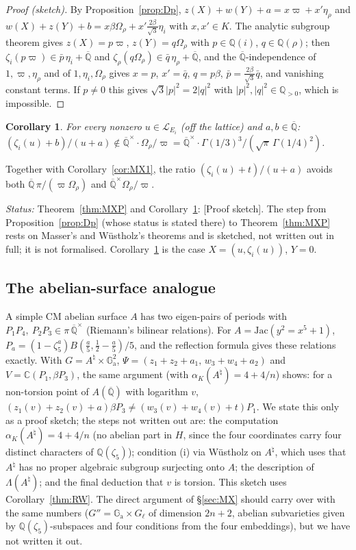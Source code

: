 \documentclass[11pt]{amsart}
\newtheorem{corollary}[theorem]{Corollary}
\theoremstyle{definition}
\newcommand{\Qb}{\overline{\mathbb{Q}}}
\newcommand{\C}{\mathbb{C}}
\newcommand{\Q}{\mathbb{Q}}
\newcommand{\Ga}{\mathbb{G}_{\mathrm a}}
\newcommand{\Lg}{\mathcal{L}}
\newcommand{\vp}{\varpi}
\newcommand{\lab}[1]{\textup{[#1]}}
\newcommand{\LabS}{\lab{Proof sketch}}
\newcommand{\Status}{\noindent\emph{Status:} }
\begin{document}
\begin{proof}[Proof (sketch)]
By Proposition~\ref{prop:Dp}, $z(X)+w(Y)+a=x\vp+x'\eta_\rho$ and $w(X)+z(Y)+b=x\beta\Omega_\rho+x'\tfrac{2\beta}{\sqrt3}\eta_i$
with $x,x'\in K$. The analytic subgroup theorem gives $z(X)=p\vp$, $z(Y)=q\Omega_\rho$ with $p\in\Q(i)$, $q\in\Q(\rho)$;
then $\zeta_i(p\vp)\in\bar p\,\eta_i+\Qb$ and $\zeta_\rho(q\Omega_\rho)\in\bar q\,\eta_\rho+\Qb$, and the $\Qb$-independence of
$1,\vp,\eta_\rho$ and of $1,\eta_i,\Omega_\rho$ gives $x=p$, $x'=\bar q$, $q=p\beta$, $\bar p=\tfrac{2\beta}{\sqrt3}\bar q$, and
vanishing constant terms. If $p\ne0$ this gives $\sqrt3|p|^2=2|q|^2$ with $|p|^2,|q|^2\in\Q_{>0}$, which is impossible.
\end{proof}

\begin{corollary}\label{cor:MXP}
For every nonzero $u\in\Lg_{E_i}$ (off the lattice) and $a,b\in\Qb$:
$(\zeta_i(u)+b)/(u+a)\notin\Qb^\times\cdot\Omega_\rho/\vp=\Qb^\times\cdot\Gamma(1/3)^3/(\sqrt\pi\,\Gamma(1/4)^2)$.
\end{corollary}

\noindent Together with Corollary~\ref{cor:MX1}, the ratio $(\zeta_i(u)+t)/(u+a)$ avoids both $\Qb\,\pi/(\vp\Omega_\rho)$ and
$\Qb^\times\Omega_\rho/\vp$.


\Status Theorem~\ref{thm:MXP} and Corollary~\ref{cor:MXP}: \LabS. The step from Proposition~\ref{prop:Dp} (whose status is
stated there) to Theorem~\ref{thm:MXP} rests on Masser's and W\"ustholz's theorems and is sketched, not written out in full;
it is not formalised. Corollary~\ref{cor:MXP} is the case $X=(u,\zeta_i(u))$, $Y=0$.

\subsection{The abelian-surface analogue}\label{sec:MXA}
A simple CM abelian surface $A$ has two eigen-pairs of periods with $P_1P_4,\ P_2P_3\in\pi\,\Qb^\times$ (Riemann's bilinear
relations). For $A=\mathrm{Jac}(y^2=x^5+1)$, $P_a=(1-\zeta_5^a)B(\tfrac a5,\tfrac12-\tfrac a5)/5$, and the reflection
formula gives these relations exactly. With $G=A^\natural\times\Ga^2$, $\Psi=(z_1+z_2+a_1,\,w_3+w_4+a_2)$ and
$V=\C(P_1,\beta P_3)$, the same argument (with $\alpha_K(A^\natural)=4+4/n$) shows: for a non-torsion point of $A(\Qb)$ with
logarithm $v$, $(z_1(v)+z_2(v)+a)\beta P_3\neq(w_3(v)+w_4(v)+t)P_1$. We state this only as a proof sketch; the steps not
written out are: the computation $\alpha_K(A^\natural)=4+4/n$ (no abelian part in $H$, since the four coordinates carry
four distinct characters of $\Q(\zeta_5)$); condition (i) via W\"ustholz on $A^\natural$, which uses that $A^\natural$ has
no proper algebraic subgroup surjecting onto $A$; the description of $\Lambda(A^\natural)$; and the final deduction that
$v$ is torsion. This sketch uses Corollary~\ref{thm:RW}. The direct argument of \S\ref{sec:MX} should carry over with the same
numbers ($G''=\Ga\times G_\ell$ of dimension $2n+2$, abelian subvarieties given by $\Q(\zeta_5)$-subspaces and four
conditions from the four embeddings), but we have not written it out.
\end{document}
